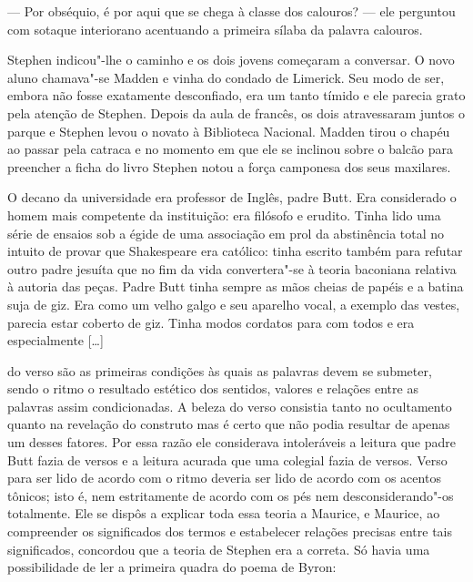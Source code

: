 --- Por obséquio, é por aqui que se chega à classe dos calouros?
--- ele perguntou com sotaque interiorano acentuando a primeira sílaba da
palavra calouros.

Stephen indicou"-lhe o caminho e os dois jovens começaram a
conversar.  O novo aluno chamava"-se Madden e vinha do condado de
Limerick.  Seu modo de ser, embora não fosse exatamente desconfiado,
era um tanto tímido e ele parecia grato pela atenção de Stephen.
Depois da aula de francês, os dois atravessaram juntos o parque e
Stephen levou o novato à Biblioteca Nacional.  Madden tirou o chapéu ao
passar pela catraca e no momento em que ele se inclinou sobre o balcão
para preencher a ficha do livro Stephen notou a força camponesa dos
seus maxilares.

O decano da universidade era professor de Inglês, padre Butt.  Era
considerado o homem mais competente da instituição: era filósofo e
erudito.  Tinha lido uma série de ensaios sob a égide de uma associação
em prol da abstinência total no intuito de provar que Shakespeare era
católico: tinha escrito também para refutar outro padre jesuíta que no
fim da vida convertera"-se à teoria baconiana relativa à autoria das
peças.  Padre Butt tinha sempre as mãos cheias de papéis e a batina
suja de giz.  Era como um velho galgo e seu aparelho vocal, a exemplo
das vestes, parecia estar coberto de giz.  Tinha modos cordatos para
com todos e era especialmente [\ldots{}]


\bigskip

{
\par}


\bigskip

do verso são as primeiras condições às quais as palavras devem se
submeter, sendo o ritmo o resultado estético dos sentidos, valores e
relações entre as palavras assim condicionadas.  A beleza do verso
consistia tanto no ocultamento quanto na revelação do construto mas é
certo que não podia resultar de apenas um desses fatores.  Por essa
razão ele considerava intoleráveis a leitura que padre Butt fazia de
versos e a leitura acurada que uma colegial fazia de versos.  Verso
para ser lido de acordo com o ritmo deveria ser lido de acordo com os
acentos tônicos; isto é, nem estritamente de acordo com os pés nem 
desconsiderando"-os totalmente.  Ele se dispôs a explicar toda essa teoria
a Maurice, e Maurice, ao compreender os significados dos termos e
estabelecer relações precisas entre tais significados, concordou que a
teoria de Stephen era a correta.  Só havia uma possibilidade de ler a
primeira quadra do poema de Byron:

